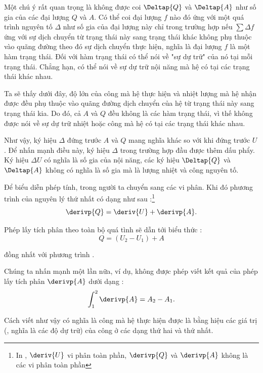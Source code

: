 Một chú ý rất quan trọng là không được coi $\Deltap{Q}$ và $\Deltap{A}$ như số gia của các đại lượng $Q$ và $A$. Có thể coi đại lượng $f$ nào đó ứng với một quá trình nguyên tố $\Delta$ như số gia của đại lượng này chỉ trong trường hợp nếu $\sum\Delta f$ ứng với sự dịch chuyển từ trạng thái này sang trạng thái khác không phụ thuộc vào quãng đường theo đó sự dịch chuyển thực hiện, nghĩa là đại lượng $f$ là một hàm trạng thái. Đối với hàm trạng thái có thể nói về "sự dự trữ" của nó tại mỗi trạng thái. Chẳng hạn, có thể nói về sự dự trữ nội năng mà hệ có tại các trạng thái khác nhau.

Ta sẽ thấy dưới đây, độ lớn của công mà hệ thực hiện và nhiệt lượng mà hệ nhận được đều phụ thuộc vào quãng đường dịch chuyển của hệ từ trạng thái này sang trạng thái kia. Do đó, cả $A$ và $Q$ đều không là các hàm trạng thái, vì thế không được nói về sự dự trữ nhiệt hoặc công mà hệ có tại các trạng thái khác nhau.

Như vậy, ký hiệu $\Delta$ đứng trước $A$ và $Q$ mang nghĩa khác so với khi đứng trước $U$. Để nhấn mạnh điều này, ký hiệu $\Delta$ trong trường hợp đầu được thêm dấu phẩy. Ký hiệu $\Delta U$ có nghĩa là số gia của nội năng, các ký hiệu $\Deltap{Q}$ và $\Deltap{A}$ không có nghĩa là số gia mà là lượng nhiệt và công nguyên tố.

Để biểu diễn phép tính, trong  người ta chuyển sang các vi phân. Khi đó phương trình của nguyên lý thứ nhất có dạng như sau :\footnote{In , $\deriv{U}$ vi phân toàn phần, $\derivp{Q}$ và $\derivp{A}$ không là các vi phân toàn phần}
\begin{equation}\label{eq:10_9}
	\derivp{Q} = \deriv{U} + \derivp{A}.
\end{equation}

\noindent
Phép lấy tích phân  theo toàn bộ quá tình sẽ dẫn tới biểu thức :
\begin{equation*}
	Q = (U_2 - U_1) + A
\end{equation*}

\noindent
đồng nhất với phương trình .

Chúng ta nhấn mạnh một lần nữa, ví dụ, không được phép viết kết quả  của phép lấy tích phân $\derivp{A}$ dưới dạng :
\begin{equation*}
	\int_{1}^{2} \derivp{A} = A_2 - A_1.
\end{equation*}

\noindent
Cách viết như vậy có nghĩa là công mà hệ thực hiện được là bằng hiệu các giá trị (\ie, nghĩa là các độ dự trữ) của công ở các dạng thứ hai và thứ nhất.

